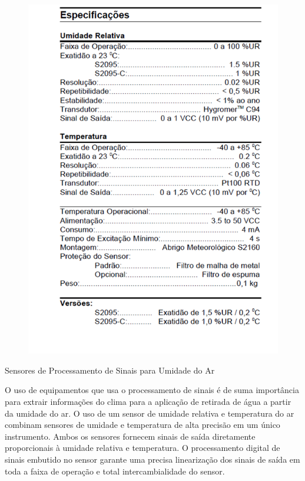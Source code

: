 \documentclass[12pt,openright,oneside,a4paper,brazil]{abntex2}
\begin{document}
\begin{figure}
\centering
\includegraphics[scale=1]{umidade}
\end{figure}
\FloatBarrier
\newpage
\begin{center}
 {\large Sensores de Processamento de Sinais para Umidade do Ar}\\
 \end{center}
 O uso de equipamentos que usa o processamento de sinais é de suma importância para extrair informações do clima para a aplicação de retirada de água a partir da umidade do ar. O uso de um sensor de umidade relativa e temperatura do ar combinam sensores de umidade e temperatura de alta precisão em um único instrumento. Ambos os sensores fornecem sinais de saída diretamente proporcionais à umidade relativa e temperatura. O  processamento digital de sinais embutido no sensor garante uma precisa linearização dos sinais de saída em toda a faixa de operação e total intercambialidade do sensor. 
 
\end{document}
